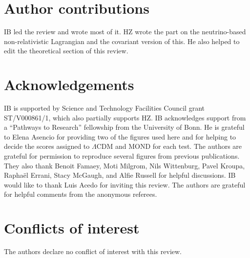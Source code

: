 \documentclass[fleqn,usenatbib,useAMS]{mnras} %
\begin{document}
\section*{Author contributions}

IB led the review and wrote most of it. HZ wrote the part on the neutrino-based non-relativistic Lagrangian and the covariant version of this. He also helped to edit the theoretical section of this review.



\section*{Acknowledgements}
\label{Acknowledgements}

IB is supported by Science and Technology Facilities Council grant ST/V000861/1, which also partially supports HZ. IB acknowledges support from a ``Pathways to Research'' fellowship from the University of Bonn. He is grateful to Elena Asencio for providing two of the figures used here and for helping to decide the scores assigned to $\Lambda$CDM and MOND for each test. The authors are grateful for permission to reproduce several figures from previous publications. They also thank Benoit Famaey, Moti Milgrom, Nils Wittenburg, Pavel Kroupa, Rapha\"{e}l Errani, Stacy McGaugh, and Alfie Russell for helpful discussions. IB would like to thank Luis Acedo for inviting this review. The authors are grateful for helpful comments from the anonymous referees.





\section*{Conflicts of interest}

The authors declare no conflict of interest with this review.







\bsp
\label{lastpage}
\end{document}
